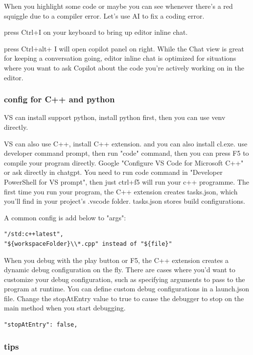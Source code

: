 \documentclass[paper=8.5in:11in, twoside, 12pt, pagesize=pdftex]{book}
\begin{document}
When you highlight some code or maybe you can see whenever there's a red squiggle due to a compiler error. Let's use AI to fix a coding error.

press Ctrl+I on your keyboard to bring up editor inline chat.


press Ctrl+alt+ I will open copilot panel on right. While the Chat view is great for keeping a conversation going, editor inline chat is optimized for situations where you want to ask Copilot about the code you're actively working on in the editor. 

\subsubsection{config for C++ and python}
VS can install support python, install python first, then you can use venv directly. 
	
VS can also use C++, install C++ extension. and you can also install cl.exe. use developer command prompt, then run "code" command, then you can press F5 to compile your program directly.   Google "Configure VS Code for Microsoft C++" or ask directly in chatgpt. You need to run code command in "Developer PowerShell for VS prompt", then just ctrl+f5 will run your c++ programme. The first time you run your program, the C++ extension creates tasks.json, which you'll find in your project's .vscode folder. tasks.json stores build configurations.

A common config is add below to "args":
\begin{lstlisting}
"/std:c++latest", 
"${workspaceFolder}\\*.cpp" instead of "${file}"
\end{lstlisting}

When you debug with the play button or F5, the C++ extension creates a dynamic debug configuration on the fly. There are cases where you'd want to customize your debug configuration, such as specifying arguments to pass to the program at runtime. You can define custom debug configurations in a launch.json file. Change the stopAtEntry value to true to cause the debugger to stop on the main method when you start debugging.
\begin{lstlisting}
"stopAtEntry": false,
\end{lstlisting}

\subsubsection{tips}
	
\end{document}
